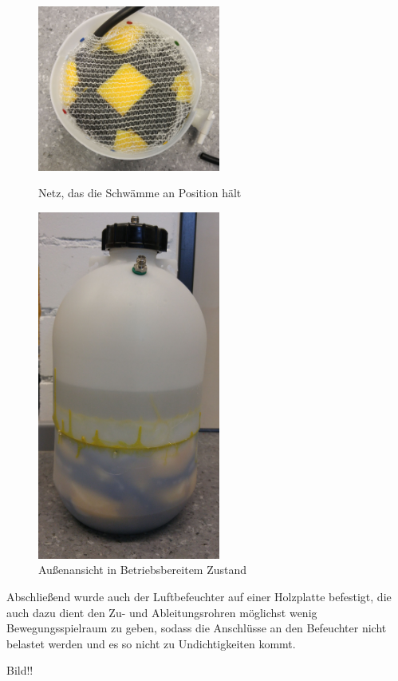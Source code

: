 \begin{figure}[h]
	\begin{minipage}[hbt]{6cm}
		\centering
		\includegraphics[width=6cm]{Luftbefeuchter_Netz.jpg}
		\caption{Netz, das die Schwämme an Position hält}
	\end{minipage}
	\hfill
	\begin{minipage}[hbt]{6cm}
		\centering
		\includegraphics[width=6cm]{Luftbefeuchter_gesamt.jpg}
		\caption{Außenansicht in Betriebsbereitem Zustand}
	\end{minipage}
\end{figure}

Abschließend wurde auch der Luftbefeuchter auf einer Holzplatte befestigt, die auch dazu dient den Zu- und Ableitungsrohren möglichst wenig Bewegungsspielraum zu geben, sodass die Anschlüsse an den Befeuchter nicht belastet werden und es so nicht zu Undichtigkeiten kommt.


Bild!!


